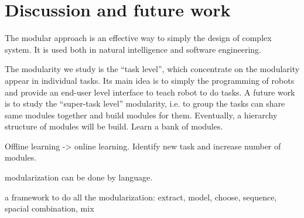 \chapter{Discussion and future work}
\label{cha6}


The modular approach is an effective way to simply the design of complex system. It is used both in natural intelligence and software engineering.

The modularity we study is the ``task level'', which concentrate on the modularity appear in individual tasks. Its main idea is to simply the programming of robots and provide an end-user level interface to teach robot to do tasks. A future work is to study the ``super-task level'' modularity, i.e. to group the tasks can share same modules together and build modules for them. Eventually, a hierarchy structure of modules will be build. Learn a bank of modules.

Offline learning -> online learning. Identify new task and increase number of modules.

modularization can be done by language.

a framework to do all the modularization: extract, model, choose, sequence, spacial combination, mix 
